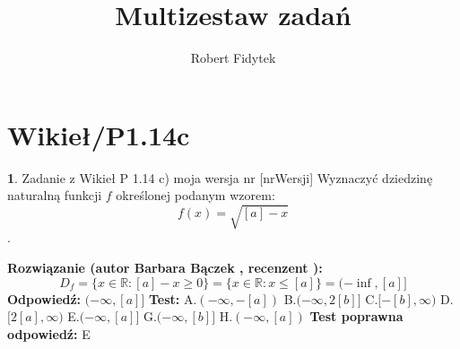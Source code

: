 \documentclass[12pt, a4paper]{article}
\title{Multizestaw zadań}
\author{Robert Fidytek}
\date{}
\theoremstyle{definition} %
\newtheorem{zad}{}
\newcommand{\kategoria}[1]{\section{#1}} %
\newcommand{\zadStart}[1]{\begin{zad}#1\newline} %
\newcommand{\zadStop}{\end{zad}}   %
\newcommand{\rozwStart}[2]{\noindent \textbf{Rozwiązanie (autor #1 , recenzent #2): }\newline} %
\newcommand{\rozwStop}{\newline}                                            %
\newcommand{\odpStart}{\noindent \textbf{Odpowiedź:}\newline}    %
\newcommand{\odpStop}{\newline}                                             %
\newcommand{\testStart}{\noindent \textbf{Test:}\newline} %
\newcommand{\testStop}{\newline} %
\newcommand{\kluczStart}{\noindent \textbf{Test poprawna odpowiedź:}\newline} %
\newcommand{\kluczStop}{\newline} %
\begin{document}
\maketitle


\kategoria{Wikieł/P1.14c}
\zadStart{Zadanie z Wikieł P 1.14 c) moja wersja nr [nrWersji]}
Wyznaczyć dziedzinę naturalną funkcji $f$ określonej podanym wzorem: 
$$f(x)=\sqrt{[a]-x}$$.
\zadStop
\rozwStart{Barbara Bączek}{}
$$D_f= \{x \in \mathbb{R}: [a]-x \ge 0\}= \{x \in \mathbb{R}: x \le [a]\}= (-\inf, [a]] $$ 
\rozwStop
\odpStart
$(-\infty, [a]]$
\odpStop
\testStart
A.$(-\infty, -[a])$
B.$(-\infty, 2 [b]]$
C.$[-[b], \infty)$
D.$[2 [a], \infty)$
E.$(-\infty, [a]]$
G.$(-\infty, [b]]$
H.$(-\infty, [a])$
\testStop
\kluczStart
E
\kluczStop
\end{document}
